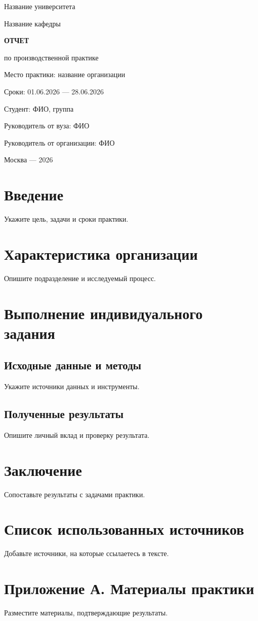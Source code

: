\documentclass[a4paper,14pt]{extarticle}
\begin{document}
\begin{titlepage}
    \centering
    Название университета\par
    Название кафедры\par
    \vfill
    \textbf{ОТЧЕТ}\par
    по производственной практике\par
    \medskip
    Место практики: название организации\par
    Сроки: 01.06.2026 --- 28.06.2026\par
    \vfill
    \begin{flushright}
        Студент: ФИО, группа\par
        Руководитель от вуза: ФИО\par
        Руководитель от организации: ФИО
    \end{flushright}
    \vfill
    Москва --- 2026
\end{titlepage}
\setcounter{page}{2}
\tableofcontents
\clearpage
\section*{Введение}
Укажите цель, задачи и сроки практики.
\section{Характеристика организации}
Опишите подразделение и исследуемый процесс.
\section{Выполнение индивидуального задания}
\subsection{Исходные данные и методы}
Укажите источники данных и инструменты.
\subsection{Полученные результаты}
Опишите личный вклад и проверку результата.
\section*{Заключение}
Сопоставьте результаты с задачами практики.
\section*{Список использованных источников}
Добавьте источники, на которые ссылаетесь в тексте.
\clearpage
\section*{Приложение А. Материалы практики}
Разместите материалы, подтверждающие результаты.
\end{document}
